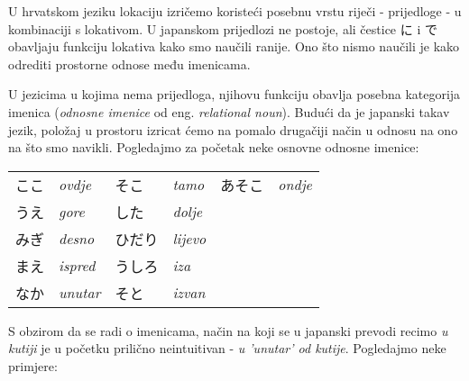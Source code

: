 \newpage
{}

	
	U hrvatskom jeziku lokaciju izričemo koristeći posebnu vrstu riječi - prijedloge - u kombinaciji s lokativom. U japanskom prijedlozi ne postoje, ali čestice に i で obavljaju funkciju lokativa kako smo naučili ranije. Ono što nismo naučili je kako odrediti prostorne odnose među imenicama.
	
	
	U jezicima u kojima nema prijedloga, njihovu funkciju obavlja posebna kategorija imenica (\textit{odnosne imenice} od eng. \textit{relational noun}). Budući da je japanski takav jezik, položaj u prostoru izricat ćemo na pomalo drugačiji način u odnosu na ono na što smo navikli. Pogledajmo za početak neke osnovne odnosne imenice:
	
	\vspace{10pt}
	\begin{tabular}{l l l l l l}
		ここ&\textit{ovdje}&そこ&\textit{tamo}&あそこ&\textit{ondje}\\
		うえ&\textit{gore}&した&\textit{dolje}&&\\
		みぎ&\textit{desno}&ひだり&\textit{lijevo}&&\\
		まえ&\textit{ispred}&うしろ&\textit{iza}&&\\
		なか&\textit{unutar}&そと&\textit{izvan}&&\\
	\end{tabular}

	\vspace{10pt}
	S obzirom da se radi o imenicama, način na koji se u japanski prevodi recimo \textit{u kutiji} je u početku prilično neintuitivan - \textit{u 'unutar' od kutije}. Pogledajmo neke primjere:
	
	\begin{reibun}
	\end{reibun}

	
